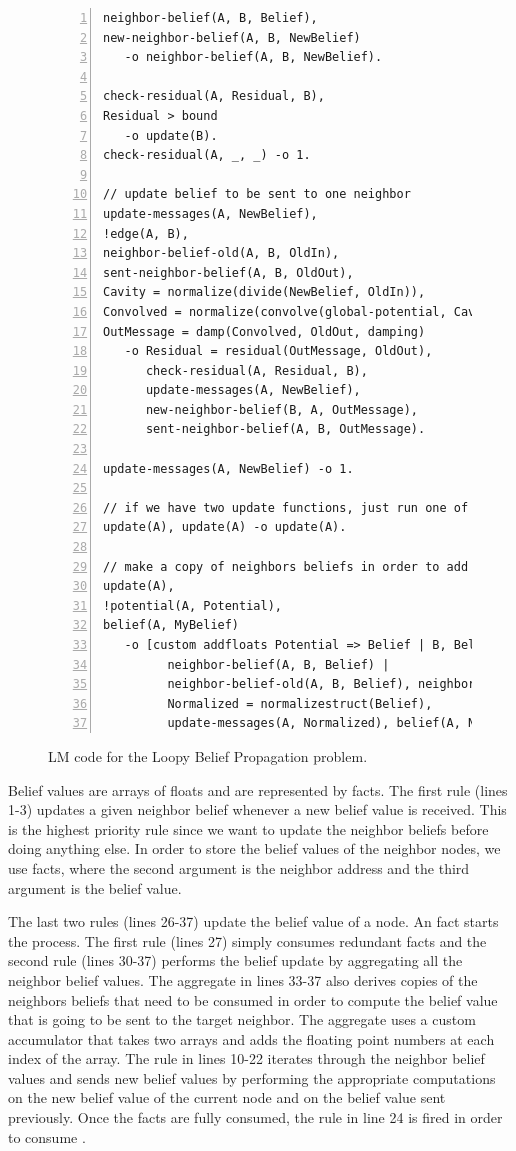 \begin{figure}[h!]
   \begin{Verbatim}[numbers=left, fontsize=\scriptsize]
neighbor-belief(A, B, Belief),
new-neighbor-belief(A, B, NewBelief)
   -o neighbor-belief(A, B, NewBelief).

check-residual(A, Residual, B),
Residual > bound
   -o update(B).
check-residual(A, _, _) -o 1.

// update belief to be sent to one neighbor
update-messages(A, NewBelief),
!edge(A, B),
neighbor-belief-old(A, B, OldIn),
sent-neighbor-belief(A, B, OldOut),
Cavity = normalize(divide(NewBelief, OldIn)),
Convolved = normalize(convolve(global-potential, Cavity)),
OutMessage = damp(Convolved, OldOut, damping)
   -o Residual = residual(OutMessage, OldOut),
      check-residual(A, Residual, B),
      update-messages(A, NewBelief),
      new-neighbor-belief(B, A, OutMessage),
      sent-neighbor-belief(A, B, OutMessage).

update-messages(A, NewBelief) -o 1.

// if we have two update functions, just run one of them
update(A), update(A) -o update(A).

// make a copy of neighbors beliefs in order to add them up
update(A),
!potential(A, Potential),
belief(A, MyBelief)
   -o [custom addfloats Potential => Belief | B, Belief |
         neighbor-belief(A, B, Belief) |
         neighbor-belief-old(A, B, Belief), neighbor-belief(A, B, Belief) |
         Normalized = normalizestruct(Belief),
         update-messages(A, Normalized), belief(A, Normalized)].
\end{Verbatim}
\caption{LM code for the Loopy Belief Propagation problem.}
\label{code:coordination:bp}
\end{figure}

Belief values are arrays of floats and are represented by 
facts. The first rule (lines 1-3) updates a given neighbor belief whenever a new
belief value is received. This is the highest priority rule since we want to
update the neighbor beliefs before doing anything else. In order to store the
belief values of the neighbor nodes, we use  facts,
where the second argument is the neighbor address and the third argument is the
belief value.

The last two rules (lines 26-37) update the belief value of a node. An
 fact starts the process. The first rule (lines 27) simply
consumes redundant  facts and the second rule (lines 30-37)
performs the belief update by aggregating all the neighbor belief values. The
aggregate in lines 33-37 also derives copies of the neighbors beliefs that need
to be consumed in order to compute the belief value that is going to be sent to
the target neighbor. The aggregate uses a custom accumulator that takes two
arrays and adds the floating point numbers at each index of the array.  The rule
in lines 10-22 iterates through the neighbor belief values and sends new belief
values by performing the appropriate computations on the new belief value of the
current node and on the belief value sent previously.  Once the facts
 are fully consumed, the rule in line 24 is fired in
order to consume .

